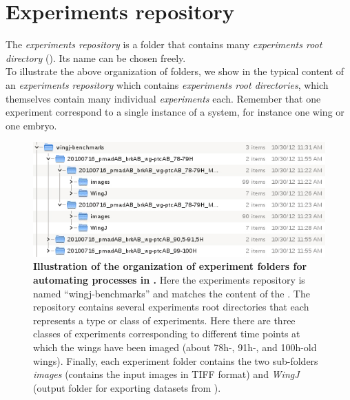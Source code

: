 \section{Experiments repository}\label{sec:experiment_repository}
The \textit{experiments repository} is a folder that contains many \textit{experiments root directory} (). Its name can be chosen freely.\\

To illustrate the above organization of folders, we show in  the typical content of an \textit{experiments repository} which contains \textit{experiments root directories}, which themselves contain many individual \textit{experiments} each. Remember that one experiment correspond to a single instance of a system, for instance one wing or one embryo.

\begin{figure}[!h]
\centering
\includegraphics[scale=0.75]{images/wingj_benchmark.jpg}
\caption{\textbf{Illustration of the organization of experiment folders for automating processes in \wingj.} Here the experiments repository is named ``wingj-benchmarks'' and matches the content of the \wingjBenchmarkImages. The repository contains several experiments root directories that each represents a type or class of experiments. Here there are three classes of experiments corresponding to different time points at which the wings have been imaged (about 78h-, 91h-, and 100h-old wings). Finally, each experiment folder contains the two sub-folders \textit{images} (contains the input images in TIFF format) and \textit{WingJ} (output folder for exporting datasets from \wingj).}
\label{fig:wingj_benchmark}
\end{figure}

